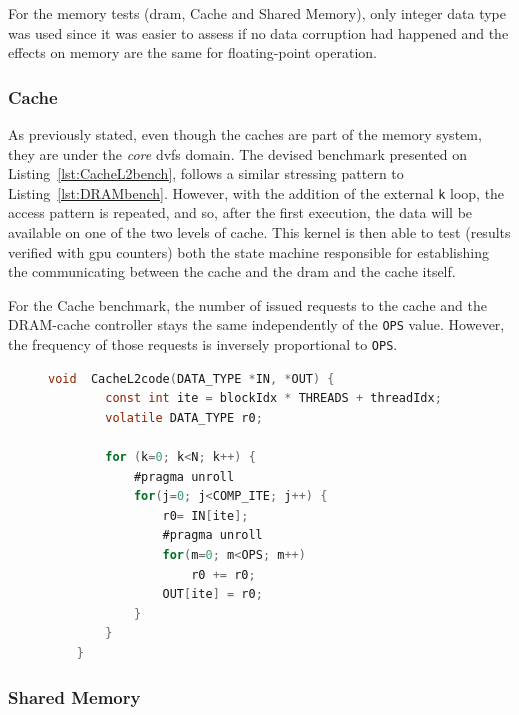 For the memory tests (\acrshort{dram}, Cache and Shared Memory), only integer data type was used since it was easier to assess if no data corruption had happened and the effects on memory are the same for floating-point operation.


\subsubsection{Cache}

As previously stated, even though the caches are part of the memory system, they are under the \textit{core} \acrshort{dvfs} domain. The devised benchmark presented on   Listing~\ref{lst:CacheL2bench}, follows a similar stressing pattern to Listing~\ref{lst:DRAMbench}. However, with the addition of the external \texttt{k} loop, the access pattern is repeated, and so, after the first execution, the data will be available on one of the two levels of cache. This kernel is then able to test (results verified with \acrshort{gpu} counters) both the state machine responsible for establishing the communicating between the cache and the \acrshort{dram} and the cache itself.

For the Cache benchmark, the number of issued requests to the cache and the DRAM-cache controller stays the same independently of the \texttt{OPS} value. However, the frequency of those requests is inversely proportional to \texttt{OPS}.

\begin{figure}[h]
    \begin{lstlisting}[language=C, caption=CacheL2 Benchmark Code, label=lst:CacheL2bench, basicstyle=\footnotesize\ttfamily,abovecaptionskip=0pt, captionpos=b]
    void  CacheL2code(DATA_TYPE *IN, *OUT) {
        const int ite = blockIdx * THREADS + threadIdx;
        volatile DATA_TYPE r0;
        
        for (k=0; k<N; k++) {
            #pragma unroll
            for(j=0; j<COMP_ITE; j++) {
                r0= IN[ite];
                #pragma unroll
                for(m=0; m<OPS; m++)    
                    r0 += r0;
                OUT[ite] = r0;
            }
        }
    }
    \end{lstlisting}
\end{figure}

\subsubsection{Shared Memory}

